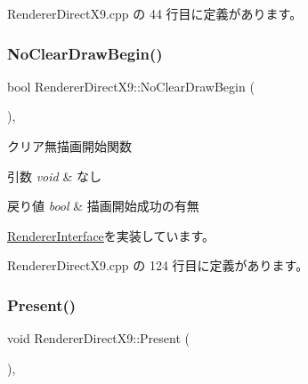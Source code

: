  Renderer\+Direct\+X9.\+cpp の 44 行目に定義があります。

\mbox{\label{class_renderer_direct_x9_ad890dee4b4da01dfe75b0c8af9628f8b}} 
\subsubsection{\texorpdfstring{No\+Clear\+Draw\+Begin()}{NoClearDrawBegin()}}
{\footnotesize\ttfamily bool Renderer\+Direct\+X9\+::\+No\+Clear\+Draw\+Begin (\begin{DoxyParamCaption}{ }\end{DoxyParamCaption})\hspace{0.3cm}{\ttfamily [override]}, {\ttfamily [virtual]}}



クリア無描画開始関数 


\begin{DoxyParams}{引数}
{\em void} & なし \\
\hline
\end{DoxyParams}

\begin{DoxyRetVals}{戻り値}
{\em bool} & 描画開始成功の有無 \\
\hline
\end{DoxyRetVals}


\mbox{\hyperlink{class_renderer_interface_a3274ae0eea630ead1af76b1aac32f420}{Renderer\+Interface}}を実装しています。



 Renderer\+Direct\+X9.\+cpp の 124 行目に定義があります。

\mbox{\label{class_renderer_direct_x9_a77dbc76e8adbe4f9ee41c5f09e5ebe81}} 
\subsubsection{\texorpdfstring{Present()}{Present()}}
{\footnotesize\ttfamily void Renderer\+Direct\+X9\+::\+Present (\begin{DoxyParamCaption}{ }\end{DoxyParamCaption})\hspace{0.3cm}{\ttfamily [override]}, {\ttfamily [virtual]}}



